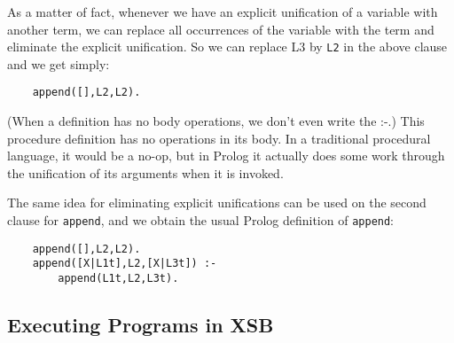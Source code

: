 As a matter of fact, whenever we have an explicit unification of a
variable with another term, we can replace all occurrences of the
variable with the term and eliminate the explicit unification.  So we
can replace L3 by \verb|L2| in the above clause and we get simply:
\begin{verbatim}
    append([],L2,L2).
\end{verbatim}
(When a definition has no body operations, we don't even write the
:-.)  This procedure definition has no operations in its body.  In a
traditional procedural language, it would be a no-op, but in Prolog it
actually does some work through the unification of its arguments when
it is invoked.

The same idea for eliminating explicit unifications can be used on the
second clause for \verb|append|, and we obtain the usual Prolog
definition of \verb|append|:
\begin{verbatim}
    append([],L2,L2).
    append([X|L1t],L2,[X|L3t]) :-
        append(L1t,L2,L3t).
\end{verbatim}

\subsection{Executing Programs in XSB}

